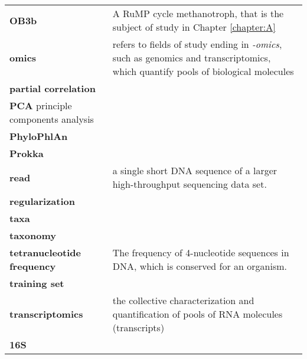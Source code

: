 \begin{singlespace}
\begin{longtable}{ p{}  p{} }
\textbf{OB3b} & A RuMP cycle methanotroph, that is the subject of study in Chapter \ref{chapter:A}  \\
\textbf{omics} & refers to fields of study ending in \textit{-omics}, such as genomics and transcriptomics, which quantify pools of biological molecules \\
\textbf{partial correlation} &  \\
\textbf{PCA} principle components analysis &  \\
\textbf{PhyloPhlAn} &  \\
\textbf{Prokka} &  \\
\textbf{read} & a single short DNA sequence of a larger high-throughput sequencing data set. \\
\textbf{regularization} &  \\
\textbf{taxa} &  \\
\textbf{taxonomy} &  \\
\textbf{tetranucleotide frequency} & The frequency of 4-nucleotide sequences in DNA, which is conserved for an organism. \\
\textbf{training set} &  \\
\textbf{transcriptomics} & the collective characterization and quantification of pools of RNA molecules (transcripts) \\
\textbf{16S} &  \\

\end{longtable}
\end{singlespace}
